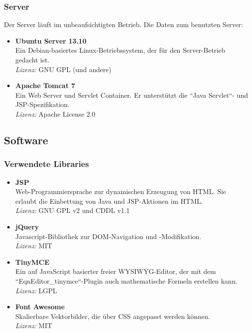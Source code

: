 \subsubsection{Server}
Der Server läuft im unbeaufsichtigten Betrieb. Die Daten zum benutzten Server:
\begin{itemize}
	\item \textbf{Ubuntu Server 13.10} \\
	Ein Debian-basiertes Linux-Betriebssystem, der für den Server-Betrieb gedacht ist. \\
	\textit{Lizenz:} GNU GPL (und andere)
	\item \textbf{Apache Tomcat 7} \\
	Ein Web Server und Servlet Container. Er unterstützt die ``Java Servlet``-  und JSP-Spezifikation. \\
	\textit{Lizenz:} Apache License 2.0
\end{itemize}

\subsection{Software}
\subsubsection{Verwendete Libraries}
\begin{itemize}
	\item \textbf{JSP} \\
	Web-Programmiersprache zur dynamischen Erzeugung von HTML. Sie erlaubt die Einbettung von Java und JSP-Aktionen im HTML. \\
	\textit{Lizenz:} GNU GPL v2 und CDDL v1.1
	\item \textbf{jQuery} \\
	Javascript-Bibliothek zur DOM-Navigation und -Modifikation.\\
	\textit{Lizenz:} MIT
	\item \textbf{TinyMCE} \\
	Ein auf JavaScript basierter freier WYSIWYG-Editor, der mit dem ``EqnEditor\_tinymce``-Plugin auch mathematische Formeln erstellen kann. \\
	\textit{Lizenz:} LGPL
	\item \textbf{Font Awesome} \\
	Skalierbare Vektorbilder, die über CSS angepasst werden können. \\
	\textit{Lizenz:} MIT
\end{itemize}